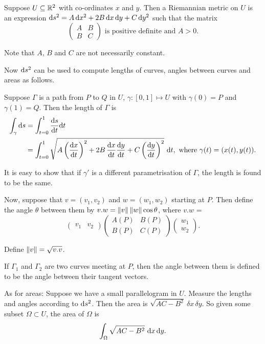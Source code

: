 \documentclass{notes}
\theoremstyle{plain}
\begin{document}
Suppose $U \subseteq \mathbb{R}^2$ with co-ordinates $x$ and $y$.  Then a Riemannian
metric on $U$ is an expression $\mathrm{d} s^2 = A\, \mathrm{d} x^2 + 2 B\, \mathrm{d} x\,
\mathrm{d} y + C\, \mathrm{d} y^2$ such that the matrix
\[
\left( \begin{matrix}
A & B \\
B & C
\end{matrix}
\right)\text{ is positive definite and } A > 0.
\]

Note that $A$, $B$ and $C$ are not necessarily constant.

Now $\mathrm{d} s^2$ can be used to compute lengths of curves, angles between
curves and areas as follows.

Suppose $\Gamma$ is a path from $P$ to $Q$ in $U$, $\gamma : [0,1] \mapsto U$
with $\gamma(0) = P$ and $\gamma(1) = Q$.  Then the length of $\Gamma$ is
\begin{align*}
  \int_\gamma \mathrm{d} s &= \int_{t=0}^1 \frac{\mathrm{d} s}{\mathrm{d} t} \mathrm{d} t \\
  &= \int_{t=0}^1 \sqrt{A \left(\frac{\mathrm{d} x}{\mathrm{d} t}\right)^2 + 2 B\,
    \frac{\mathrm{d} x}{\mathrm{d} t}\frac{\mathrm{d} y}{\mathrm{d} t} + C \left(\frac{\mathrm{d} y}{\mathrm{d}
        t}\right)^2}\ \mathrm{d} t,\text{ where } \gamma(t) = (x(t),y(t)).
\end{align*}

It is easy to show that if $\gamma'$ is a different parametrisation of
$\Gamma$, the length is found to be the same.

Now, suppose that $v = (v_1,v_2)$ and $w = (w_1, w_2)$ starting at $P$.  Then
define the angle $\theta$ between them by $v.w = \left\|v\right\| \left\|w\right\| \cos
\theta$, where $v.w$ =
\[
\left(
\begin{matrix}
v_1 & v_2
\end{matrix}
\right) \left(
\begin{matrix}
A(P) & B(P) \\
B(P) & C(P)
\end{matrix}
\right) \left(
\begin{matrix}
w_1 \\
w_2
\end{matrix}
\right).
\]

Define $\left\|v\right\| = \sqrt{v.v}$.

If $\Gamma_1$ and $\Gamma_2$ are two curves meeting at $P$, then the angle
between them is defined to be the angle between their tangent vectors.

As for areas:  Suppose we have a small parallelogram in $U$.  Measure the
lengths and angles according to $\mathrm{d} s^2$.  Then the area is $\sqrt{A C - B^2}\
\delta x\, \delta y$.  So given some subset $\Omega \subset U$, the area of
$\Omega$ is 
\[
\int_\Omega \sqrt{A C - B^2}\ \mathrm{d} x\, \mathrm{d} y.
\]
\end{document}
